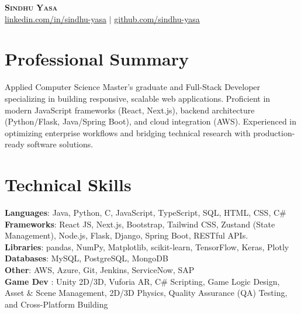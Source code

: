 \documentclass[letterpaper,11pt]{article}
\begin{document}
\begin{center}
    \textbf{\Huge \scshape Sindhu Yasa} \\ \vspace{1pt}
    \small \href{https://linkedin.com/in/sindhu-yasa}{\underline{linkedin.com/in/sindhu-yasa}} $|$
    \href{https://github.com/sindhu-yasa}{\underline{github.com/sindhu-yasa}}
\end{center}

\section{Professional Summary}
\vspace{-8pt}
Applied Computer Science Master’s graduate and Full-Stack Developer specializing in building responsive, scalable web applications. Proficient in modern JavaScript frameworks (React, Next.js), backend architecture (Python/Flask, Java/Spring Boot), and cloud integration (AWS). Experienced in optimizing enterprise workflows and bridging technical research with production-ready software solutions.

\section{Technical Skills}
\vspace{-8pt}
 \begin{itemize}[leftmargin=0.15in, label={}]
    \small{\item{
    
     \textbf{Languages}{: Java, Python, C, JavaScript, TypeScript, SQL, HTML, CSS, C\#} \\
     \textbf{Frameworks}{: React JS, Next.js, Bootstrap, Tailwind CSS, Zustand (State Management), Node.js, Flask, Django, Spring Boot, RESTful APIs.} \\
     \textbf{Libraries}{: pandas, NumPy, Matplotlib, scikit-learn, TensorFlow, Keras, Plotly} \\
     \textbf{Databases}{: MySQL, PostgreSQL, MongoDB} \\
     \textbf{Other}{: AWS, Azure, Git, Jenkins, ServiceNow, SAP}\\
     \textbf{Game Dev} {: Unity 2D/3D, Vuforia AR, C\# Scripting, Game Logic Design, Asset \& Scene Management, 2D/3D Physics, Quality Assurance (QA) Testing, and Cross-Platform Building } 
    }}
 \end{itemize}
\end{document}
